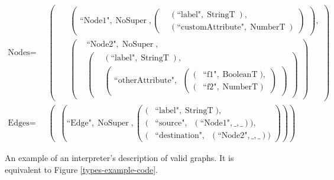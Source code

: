 \documentclass[12pt]{article}
\DeclareMathOperator{\StringT}{StringT}
\DeclareMathOperator{\NumberT}{NumberT}
\DeclareMathOperator{\BooleanT}{BooleanT}
\DeclareMathOperator{\RecT}{RecT_\Gamma}
\DeclareMathOperator{\ObjT}{ObjT_\Gamma}
\DeclareMathOperator{\UnionT}{UnionT_\Gamma}
\DeclareMathOperator{\NoSuper}{NoSuper}
\begin{document}
\begin{figure}
\begin{mdframed}
\small
\begin{align*}
    \text{Nodes} = &\UnionT\left(
        \begin{aligned}
        &\ObjT\left(
            \begin{aligned}    
                \text{``Node1"}, \NoSuper, \left(
                    \begin{aligned}
                        &(\text{``label"}, \StringT),  \\
                        &(\text{``customAttribute"}, \NumberT)
                    \end{aligned}\right)
            \end{aligned}\right),  \\
        &\ObjT\left(\begin{aligned} &\text{``Node2"}, \NoSuper,\\&\left(\begin{aligned}
            &(\text{``label"}, \StringT),  \\
            &\left(\begin{aligned}
                \text{``otherAttribute"},\RecT\left(
                \begin{aligned}
                    (&\text{``f1"}, \BooleanT),  \\
                    (&\text{``f2"}, \NumberT)
                \end{aligned}\right)
            \end{aligned}\right)
        \end{aligned}\right)\end{aligned}\right)
        \end{aligned}\right)  \\
    \text{Edges} = &\UnionT\left(\ObjT\left(
        \text{``Edge"}, \NoSuper,  
        \left(\begin{aligned}
            (&\text{``label"}, \StringT), \\
            (&\text{``source"}, \ObjT(\text{``Node1"}, \_, \_)), \\
            (&\text{``destination"}, \ObjT(\text{``Node2"}, \_, \_))              
        \end{aligned}\right)\right)\right)
\end{align*}
\normalsize
\end{mdframed}
\caption{An example of an interpreter's description of valid graphs. 
It is equivalent to Figure \ref{types-example-code}.}
\label{types-example}
\end{figure}
\end{document}
